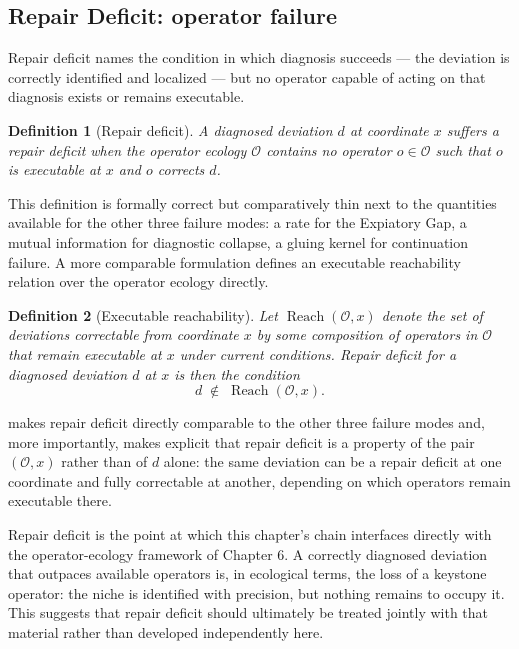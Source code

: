 \documentclass[12pt]{report}
\newtheorem{definition}{Definition}[section]
\begin{document}
\subsection{Repair Deficit: operator failure}
\label{subsec:repair-deficit}

Repair deficit names the condition in which diagnosis succeeds --- the
deviation is correctly identified and localized --- but no operator
capable of acting on that diagnosis exists or remains executable.

\begin{definition}[Repair deficit]
A diagnosed deviation $d$ at coordinate $x$ suffers a repair deficit when
the operator ecology $\mathcal{O}$ contains no operator $o \in \mathcal{O}$
such that $o$ is executable at $x$ and $o$ corrects $d$.
\end{definition}

This definition is formally correct but comparatively thin next to the
quantities available for the other three failure modes: a rate for the
Expiatory Gap, a mutual information for diagnostic collapse, a gluing
kernel for continuation failure. A more comparable formulation defines an
executable reachability relation over the operator ecology directly.

\begin{definition}[Executable reachability]
\label{def:reach}
Let $\operatorname{Reach}(\mathcal{O}, x)$ denote the set of deviations
correctable from coordinate $x$ by some composition of operators in
$\mathcal{O}$ that remain executable at $x$ under current conditions.
Repair deficit for a diagnosed deviation $d$ at $x$ is then the condition
\[
d \;\notin\; \operatorname{Reach}(\mathcal{O}, x).
\]
\end{definition}

 makes repair deficit directly comparable to the other
three failure modes and, more importantly, makes explicit that repair
deficit is a property of the pair $(\mathcal{O}, x)$ rather than of $d$
alone: the same deviation can be a repair deficit at one coordinate and
fully correctable at another, depending on which operators remain
executable there.

Repair deficit is the point at which this chapter's chain interfaces
directly with the operator-ecology framework of Chapter 6. A correctly
diagnosed deviation that outpaces available operators
is, in ecological terms, the loss of a keystone operator: the niche is
identified with precision, but nothing remains to occupy it. This
suggests that repair deficit should ultimately be treated jointly with
that material rather than developed independently here.
\end{document}
